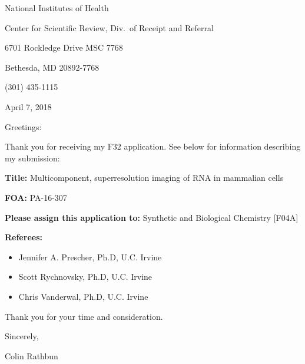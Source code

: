 
National Institutes of Health

Center for Scientific Review, Div.\ of Receipt and Referral

6701 Rockledge Drive MSC 7768

Bethesda, MD 20892-7768

(301) 435-1115

\vspace{0.5cm}
April 7, 2018

\vspace{0.5cm}
Greetings:

Thank you for receiving my F32 application. See below for information describing my submission:

\vspace{0.5cm}
\textbf{Title:} Multicomponent, superresolution imaging of RNA in mammalian cells

\vspace{0.5cm}
\textbf{FOA:} PA-16-307

\vspace{0.5cm}
\textbf{Please assign this application to:} Synthetic and Biological Chemistry [F04A]

\vspace{0.5cm}
\textbf{Referees:}
\begin{itemize}
  \item Jennifer A. Prescher, Ph.D, U.C. Irvine
  \item Scott Rychnovsky, Ph.D, U.C. Irvine
  \item Chris Vanderwal, Ph.D, U.C. Irvine
\end{itemize}
\vspace{2cm}
Thank you for your time and consideration.

\vspace{0.5cm}
Sincerely,

\vspace{3cm}
Colin Rathbun

